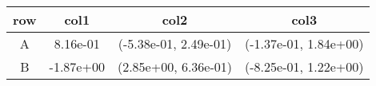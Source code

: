 \begin{tabular}{cccc}
\toprule
row&col1&col2&col3\tabularnewline
\midrule
A&8.16e-01& (-5.38e-01, 2.49e-01)& (-1.37e-01, 1.84e+00)\tabularnewline
B&-1.87e+00& (2.85e+00, 6.36e-01)& (-8.25e-01, 1.22e+00)\tabularnewline
\bottomrule
\end{tabular}
